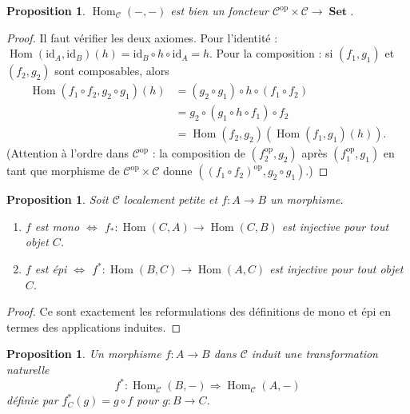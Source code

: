 \documentclass[a4paper,12pt]{book}
\DeclareMathOperator{\Hom}{Hom}
\DeclareMathOperator{\Set}{\mathbf{Set}}
\newcommand{\op}{\mathrm{op}}
\newcommand{\id}{\mathrm{id}}
\newtheorem{proposition}[theoreme]{Proposition}
\begin{document}
\begin{proposition}\label{prop:hom-bifoncteur}
$\Hom_\mathcal{C}(-, -)$ est bien un foncteur $\mathcal{C}^{\op} \times \mathcal{C} \to \Set$.
\end{proposition}

\begin{proof}
Il faut vérifier les deux axiomes. Pour l'identité : $\Hom(\id_A, \id_B)(h) = \id_B \circ h \circ \id_A = h$. Pour la composition : si $(f_1, g_1)$ et $(f_2, g_2)$ sont composables, alors
\begin{align*}
  \Hom(f_1 \circ f_2, g_2 \circ g_1)(h) &= (g_2 \circ g_1) \circ h \circ (f_1 \circ f_2) \\
  &= g_2 \circ (g_1 \circ h \circ f_1) \circ f_2 \\
  &= \Hom(f_2, g_2)(\Hom(f_1, g_1)(h)).
\end{align*}
(Attention à l'ordre dans $\mathcal{C}^{\op}$ : la composition de $(f_2^{\op}, g_2)$ après $(f_1^{\op}, g_1)$ en tant que morphisme de $\mathcal{C}^{\op} \times \mathcal{C}$ donne $((f_1 \circ f_2)^{\op}, g_2 \circ g_1)$.)
\end{proof}

\begin{proposition}\label{prop:hom-mono-epi}
Soit $\mathcal{C}$ localement petite et $f : A \to B$ un morphisme.
\begin{enumerate}[label=(\roman*)]
  \item $f$ est mono $\iff$ $f_* : \Hom(C, A) \to \Hom(C, B)$ est injective pour tout objet $C$.
  \item $f$ est épi $\iff$ $f^* : \Hom(B, C) \to \Hom(A, C)$ est injective pour tout objet $C$.
\end{enumerate}
\end{proposition}

\begin{proof}
Ce sont exactement les reformulations des définitions de mono et épi en termes des applications induites.
\end{proof}

\begin{proposition}\label{prop:hom-transfo-nat}
Un morphisme $f : A \to B$ dans $\mathcal{C}$ induit une transformation naturelle
\[
  f^* : \Hom_\mathcal{C}(B, -) \Longrightarrow \Hom_\mathcal{C}(A, -)
\]
définie par $f^*_C(g) = g \circ f$ pour $g : B \to C$.
\end{proposition}
\end{document}
